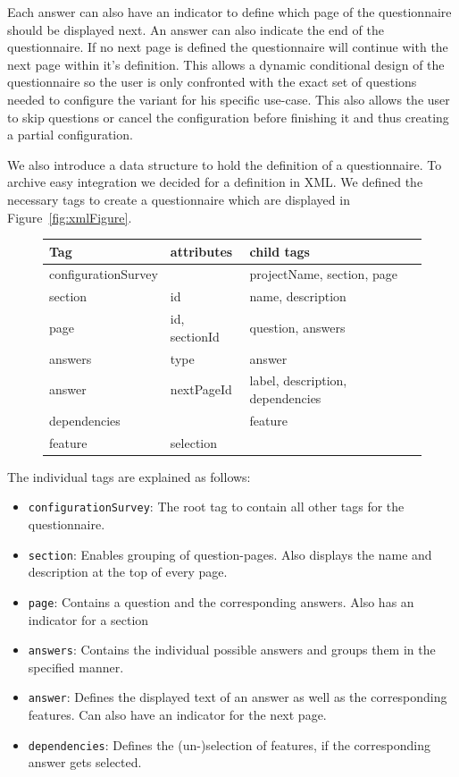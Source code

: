 Each answer can also have an indicator to define which page of the questionnaire should be displayed next. An answer can also indicate the end of the questionnaire. If no next page is defined the questionnaire will continue with the next page within it's definition. This allows a dynamic conditional design of the questionnaire so the user is only confronted with the exact set of questions needed to configure the variant for his specific use-case. This also allows the user to skip questions or cancel the configuration before finishing it and thus creating a partial configuration.

We also introduce a data structure to hold the definition of a questionnaire. To archive easy integration we decided for a definition in XML. We defined the necessary tags to create a questionnaire which are displayed in Figure~\ref{fig:xmlFigure}.

\begin{figure}[H]
\begin{tabulary}{\linewidth}{LLL}
\textbf{Tag} & \textbf{attributes} & \textbf{child tags}\\
\hline
configurationSurvey & & projectName, section, page\\
section & id & name, description\\
page & id, sectionId & question, answers\\
answers & type & answer\\
answer & nextPageId & label, description, dependencies\\
dependencies & & feature\\
feature & selection & \\
\end{tabulary}\vspace{2.5em}
\end{figure}

The individual tags are explained as follows:
\begin{itemize}
\item \texttt{configurationSurvey}: The root tag to contain all other tags for the questionnaire.
\item \texttt{section}: Enables grouping of question-pages. Also displays the name and description at the top of every page.
\item \texttt{page}: Contains a question and the corresponding answers. Also has an indicator for a section
\item \texttt{answers}: Contains the individual possible answers and groups them in the specified manner.
\item \texttt{answer}: Defines the displayed text of an answer as well as the corresponding features. Can also have an indicator for the next page.
\item \texttt{dependencies}: Defines the (un-)selection of features, if the corresponding answer gets selected.
\end{itemize}

